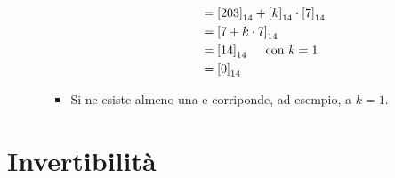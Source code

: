 \documentclass[10pt]{article}
\begin{document}
\begin{itemize}
\begin{enumerate}
\begin{itemize}
\begin{equation}
\begin{split}
	&= \left[203\right]_{14} + \left[k\right]_{14} \cdot \left[7\right]_{14} \\
	&= \left[7 + k \cdot 7\right]_{14} \\
	&= \left[14\right]_{14} \textrm{ \quad con } k=1 \\
	&= \left[0\right]_{14} \\
	\end{split}
	\end{equation}
	\item
	Si ne esiste almeno una e corriponde, ad esempio, a $k=1$.
	\end{itemize}
	\end{enumerate}
	\end{itemize}
	
	\newpage
	
  \section{Invertibilità}
\end{document}
